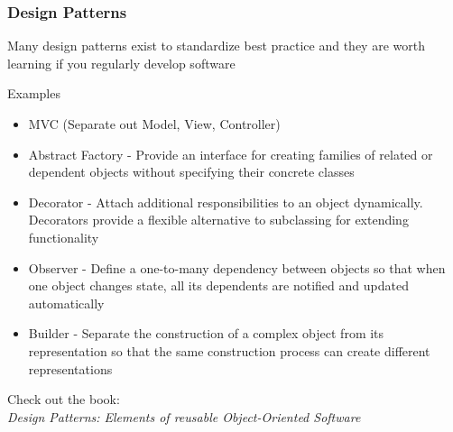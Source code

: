 \documentclass[table,dvipsnames]{beamer}
\newcommand{\highlt}{\textcolor{NavyBlue}}
\begin{document}
\begin{frame}[fragile]
\frametitle{Design Patterns}
\scriptsize
Many design patterns exist to standardize best practice and  they are worth learning if you regularly develop software
\vspace{0.5cm}

\begin{block}{Examples}
\begin{itemize}
 \item \highlt{MVC} (Separate out Model, View, Controller)
 \item \highlt{Abstract Factory} - Provide an interface for creating families of related or dependent objects without
specifying their concrete classes
 \item \highlt{Decorator} - Attach additional responsibilities to an object dynamically. Decorators provide a
flexible alternative to subclassing for extending functionality
 \item \highlt{Observer} - Define a one-to-many dependency between objects so that when one object
changes state, all its dependents are notified and updated automatically
 \item \highlt{Builder} - Separate the construction of a complex object from its representation so that the
same construction process can create different representations
\end{itemize}
\end{block}

\vspace{0.5cm}
Check out the book: \\
\textsl{Design Patterns: Elements of reusable Object-Oriented Software}
\end{frame}
\end{document}
